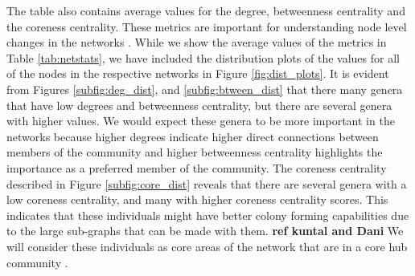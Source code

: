 The table also contains average values for the degree, betweenness centrality and the coreness centrality. These metrics are important for understanding node level changes in the networks \citep{Kuntal2018}. While we show the average values of the metrics in Table \ref{tab:netstats}, we have included the distribution plots of the values for all of the nodes in the respective networks in Figure \ref{fig:dist_plots}. It is evident from Figures \ref{subfig:deg_dist}, and \ref{subfig:btween_dist} that there many genera that have low degrees and betweenness centrality, but there are several genera with higher values. We would expect these genera to be more important in the networks because higher degrees indicate higher direct connections between members of the community and higher betweenness centrality highlights the importance as a preferred member of the community. The coreness centrality described in Figure \ref{subfig:core_dist} reveals that there are several genera with a low coreness centrality, and many with higher coreness centrality scores. This indicates that these individuals might have better colony forming capabilities due to the large sub-graphs that can be made with them. \textbf{ref kuntal and Dani} We will consider these individuals as core areas of the network that are in a core hub community \citep{Kuntal2018}.


